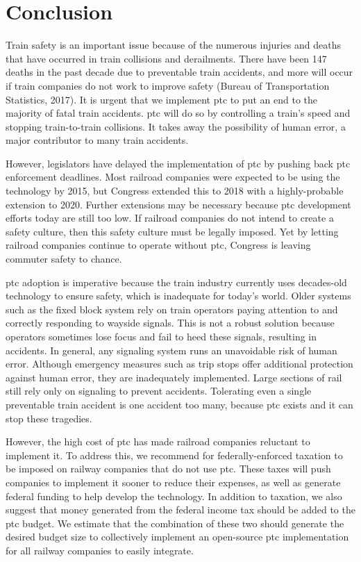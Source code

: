 \documentclass[11pt, titlepage]{article}
\begin{document}
\pagebreak

\section{Conclusion}

Train safety is an important issue because of the numerous injuries and deaths that
have occurred in train collisions and derailments. There have been 147 deaths in the
past decade due to preventable train accidents, and more will occur if train
companies do not work to improve safety (Bureau of Transportation Statistics, 2017).
It is urgent that we implement \gls{ptc} to put an end to the majority of fatal
train accidents. \gls{ptc} will do so by controlling a train’s speed and stopping
train-to-train collisions. It takes away the possibility of human error, a major
contributor to many train accidents.

However, legislators have delayed the implementation of \gls{ptc} by pushing back
\gls{ptc} enforcement deadlines. Most railroad companies were expected to be using
the technology by 2015, but Congress extended this to 2018 with a highly-probable
extension to 2020. Further extensions may be necessary because \gls{ptc} development
efforts today are still too low. If railroad companies do not intend to create a
safety culture, then this safety culture must be legally imposed. Yet by letting
railroad companies continue to operate without \gls{ptc}, Congress is leaving
commuter safety to chance.

\gls{ptc} adoption is imperative because the train industry currently uses
decades-old technology to ensure safety, which is inadequate for today’s world.
Older systems such as the fixed block system rely on train operators paying
attention to and correctly responding to wayside signals. This is not a robust
solution because operators sometimes lose focus and fail to heed these signals,
resulting in accidents. In general, any signaling system runs an unavoidable risk of
human error. Although emergency measures such as trip stops offer additional
protection against human error, they are inadequately implemented. Large sections of
rail still rely only on signaling to prevent accidents. Tolerating even a single
preventable train accident is one accident too many, because \gls{ptc} exists and it
can stop these tragedies.

However, the high cost of \gls{ptc} has made railroad companies reluctant to
implement it. To address this, we recommend for federally-enforced taxation to be
imposed on railway companies that do not use \gls{ptc}. These taxes will push
companies to implement it sooner to reduce their expenses, as well as generate
federal funding to help develop the technology. In addition to taxation, we also
suggest that money generated from the federal income tax should be added to the
\gls{ptc} budget. We estimate that the combination of these two should generate the
desired budget size to collectively implement an open-source \gls{ptc}
implementation for all railway companies to easily integrate.
\end{document}
